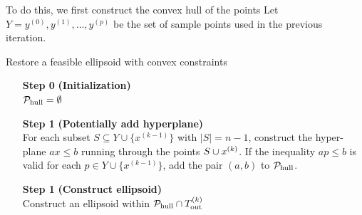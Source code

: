 
To do this, we first construct the convex hull of the points 
Let $Y = y^{(0)}, y^{(1)}, \ldots, y^{(p)}$ be the set of sample points used in the previous iteration.

{
\begin{fullwidth}[leftmargin=0in, rightmargin=0in, width=\linewidth-0.25in]
\begin{flushleft}


\begin{algorithm}[H]
    \caption{Restore a feasible ellipsoid with convex constraints}
    \label{restore_feasible_ellipsoid_convex}
    \begin{itemize}
        \item[\textbf{Step 0}] \textbf{(Initialization)} \\
            $\mathcal P_{\textrm{hull}} = \emptyset$
            
        \item[\textbf{Step 1}] \textbf{(Potentially add hyperplane)} \\
	    For each subset $S \subseteq Y \cup \{x^{(k-1)}\}$ with $|S| = n - 1$, construct the hyper-plane $ax\le b$ running through the points $S \cup x^{(k)}$.
	    If the inequality $ap \le b$ is valid for each $p \in Y \cup \{x^{(k-1)}\}$, add the pair $(a, b)$ to $\mathcal P_{\textrm{hull}}$.
	
	\item[\textbf{Step 1}] \textbf{(Construct ellipsoid)} \\
	   Construct an ellipsoid within $\mathcal P_{\textrm{hull}} \cap {T_{\text{out}}^{(k)}}$ \\
    \end{itemize}
\end{algorithm}

\end{flushleft}
\end{fullwidth}
}



